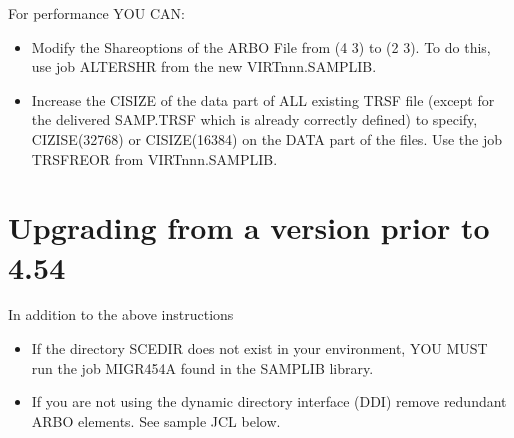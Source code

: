 \documentclass[letterpaper,10pt,english]{sphinxmanual}
\begin{document}
\sphinxAtStartPar
For performance YOU CAN:
\begin{itemize}
\item {} 
\sphinxAtStartPar
Modify the Shareoptions of the ARBO File from (4 3) to (2 3). To do this, use job ALTERSHR from the new VIRTnnn.SAMPLIB.

\item {} 
\sphinxAtStartPar
Increase the CISIZE of the data part of ALL existing TRSF file (except for the delivered SAMP.TRSF which is already correctly defined) to specify, CIZISE(32768) or CISIZE(16384) on the DATA part of the files. Use the job TRSFREOR from VIRTnnn.SAMPLIB.

\end{itemize}

\ignorespaces 

\section{Upgrading from a version prior to 4.54}
\label{\detokenize{Migration_Guide:upgrading-from-a-version-prior-to-4-54}}\label{\detokenize{Migration_Guide:index-4}}
\sphinxAtStartPar
In addition to the above instructions
\begin{itemize}
\item {} 
\sphinxAtStartPar
If the directory SCE\sphinxhyphen{}DIR does not exist in your environment, YOU MUST run the job MIGR454A found in the SAMPLIB library.

\item {} 
\sphinxAtStartPar
If you are not using the dynamic directory interface (DDI) remove redundant ARBO elements. See sample JCL below.

\end{itemize}
\end{document}
